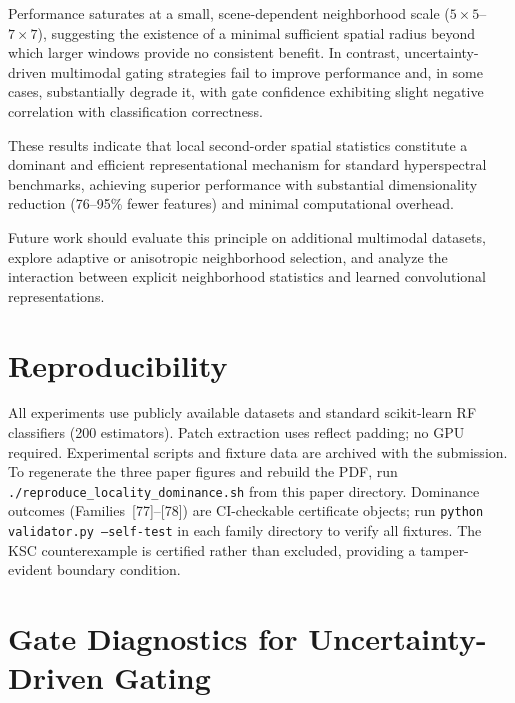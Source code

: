 \documentclass[journal]{IEEEtran}
\begin{document}
Performance saturates at a small, scene-dependent neighborhood scale
($5{\times}5$--$7{\times}7$), suggesting the existence of a minimal
sufficient spatial radius beyond which larger windows provide no
consistent benefit. In contrast, uncertainty-driven multimodal gating
strategies fail to improve performance and, in some cases,
substantially degrade it, with gate confidence exhibiting slight
negative correlation with classification correctness.

These results indicate that local second-order spatial statistics
constitute a dominant and efficient representational mechanism for
standard hyperspectral benchmarks, achieving superior performance
with substantial dimensionality reduction (76--95\% fewer features)
and minimal computational overhead.

Future work should evaluate this principle on additional multimodal
datasets, explore adaptive or anisotropic neighborhood selection,
and analyze the interaction between explicit neighborhood statistics
and learned convolutional representations.

\section*{Reproducibility}

All experiments use publicly available datasets and standard
scikit-learn RF classifiers (200 estimators). Patch extraction
uses reflect padding; no GPU required. Experimental scripts and
fixture data are archived with the submission.
To regenerate the three paper figures and rebuild the PDF, run
\texttt{./reproduce\_locality\_dominance.sh} from this paper directory.
Dominance outcomes (Families~[77]--[78]) are CI-checkable certificate
objects; run \texttt{python validator.py --self-test} in each family
directory to verify all fixtures.  The KSC counterexample is certified
rather than excluded, providing a tamper-evident boundary condition.

\appendix
\section{Gate Diagnostics for Uncertainty-Driven Gating}
\label{app:gating}
\end{document}

